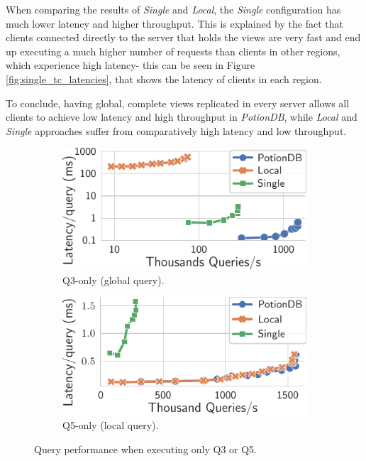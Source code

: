 \documentclass[sigplan,twocolumn,review,anonymous]{acmart}
\begin{document}
When comparing the results of \textit{Single} and \textit{Local}, the \textit{Single} configuration has much lower latency and higher throughput. This is explained by the fact that clients connected directly to the server that holds the views are very fast and 
end up executing a much higher number of requests than clients in other regions, which experience high latency- this can be 
seen in Figure \ref{fig:single_tc_latencies}, that shows the latency of clients in each region.

To conclude, having global, complete views replicated in every server allows all clients to achieve low latency and high throughput in \textit{PotionDB}, while \textit{Local} and \textit{Single} approaches suffer from comparatively high latency and low throughput.



\begin{figure}
	\centering
	\begin{subfigure}{.49\linewidth}
		\includegraphics[width=1\linewidth]{singleQuery/q3_latency}
		\caption{Q3-only (global query).}
		\label{fig:q3_tc}
	\end{subfigure}%
	\hspace*{0.2em}
	\begin{subfigure}{.49\linewidth}
		\includegraphics[width=1\linewidth]{singleQuery/q5_latency}
		\caption{Q5-only (local query).}
		\label{fig:q5_tc}
	\end{subfigure}%
	\vspace*{-0.55em}
	\caption{Query performance when executing only Q3 or Q5.}
	\label{fig:q3_q5_tc}
	\vspace*{-1.1em}
\end{figure}
\end{document}
